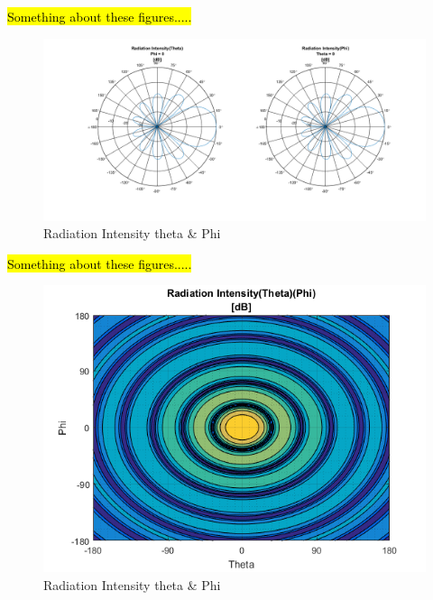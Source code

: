\hl{Something about these figures.....}

\begin{figure}[H]
	\centering
	\includegraphics[scale=0.4]{figures/radiation_intensity_theta_phi.png}
	\caption{Radiation Intensity theta \& Phi}
	\label{fig:radiation_intensity_theta_phi_2}
\end{figure}

\hl{Something about these figures.....}

\begin{figure}[H]
	\centering
	\includegraphics[scale=0.6]{figures/radiation_intensity_theta_phi_1.png}
	\caption{Radiation Intensity theta \& Phi}
	\label{fig:radiation_intensity_theta_phi_1}
\end{figure}


